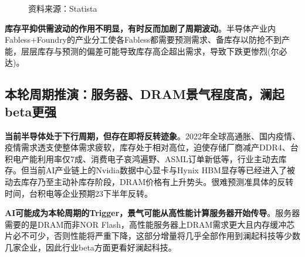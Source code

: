 \documentclass[a4paper,12pt]{ctexart}
\begin{document}
\begin{figure}[H]
\begin{minipage}{0.48\linewidth}
    \end{minipage}\par
    \footnotesize{资料来源：Statista}
\end{figure}

\textbf{库存平抑供需波动的作用不明显，有时反而加剧了周期波动}。半导体产业内Fabless+Foundry的产业分工使各Fabless都需要预测需求、备库存以防抢不到产能，层层库存与预测的偏差可能导致库存高企超出需求，导致下跌更惨烈(尔必达)。

\subsection{本轮周期推演：服务器、DRAM景气程度高，澜起beta更强}

\textbf{当前半导体处于下行周期，但存在即将反转迹象}。2022年全球高通胀、国内疫情、疫情需求透支使整体需求疲软，库存处于相对高位，迫使存储厂商减产DDR4、台积电产能利用率仅7成、消费电子哀鸿遍野、ASML订单新低等，行业主动去库存。但当前AI产业链上的Nvidia数据中心显卡与Hynix HBM显存等已经进入了被动去库存乃至主动补库存阶段，DRAM价格有上升势头。很难预测准具体的反转时间，台积电等企业预期23下半年反转。

\textbf{AI可能成为本轮周期的Trigger，景气可能从高性能计算服务器开始传导}。服务器需要的是DRAM而非NOR Flash，高性能服务器上DRAM需求更大且内存缓冲芯片必不可少，否则性能将严重下降，这部分增量将几乎全部作用到澜起科技等少数几家企业，因此行业beta方面更看好澜起科技。
\end{document}
